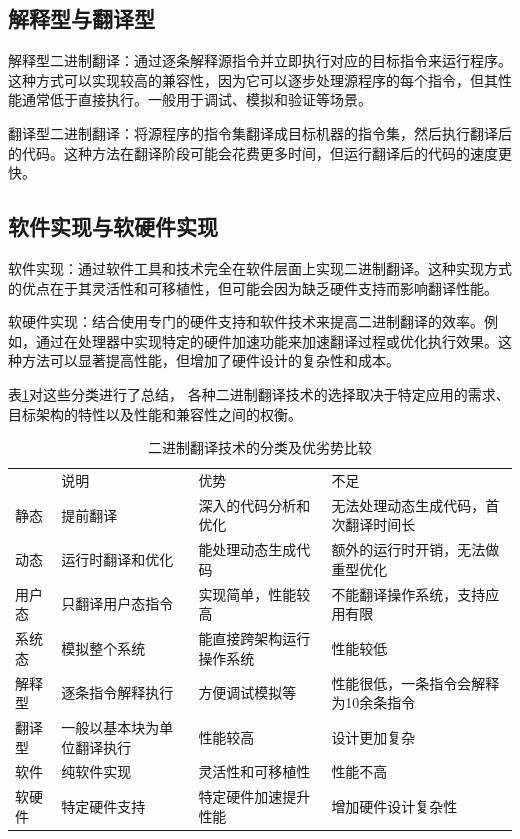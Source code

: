 \subsection{解释型与翻译型}
解释型二进制翻译：通过逐条解释源指令并立即执行对应的目标指令来运行程序。这种方式可以实现较高的兼容性，因为它可以逐步处理源程序的每个指令，但其性能通常低于直接执行。一般用于调试、模拟和验证等场景。

翻译型二进制翻译：将源程序的指令集翻译成目标机器的指令集，然后执行翻译后的代码。这种方法在翻译阶段可能会花费更多时间，但运行翻译后的代码的速度更快。

\subsection{软件实现与软硬件实现}
软件实现：通过软件工具和技术完全在软件层面上实现二进制翻译。这种实现方式的优点在于其灵活性和可移植性，但可能会因为缺乏硬件支持而影响翻译性能。

软硬件实现：结合使用专门的硬件支持和软件技术来提高二进制翻译的效率。例如，通过在处理器中实现特定的硬件加速功能来加速翻译过程或优化执行效果。这种方法可以显著提高性能，但增加了硬件设计的复杂性和成本。

表\ref{tab:BTs}对这些分类进行了总结，
各种二进制翻译技术的选择取决于特定应用的需求、目标架构的特性以及性能和兼容性之间的权衡。

\begin{table}[]
  \caption{二进制翻译技术的分类及优劣势比较}
  \label{tab:BTs}
  \begin{adjustbox}{width=\textwidth}
  \begin{tabular}{llll}
  \rowcolor[HTML]{FFCE93} 
      & 说明                  & 优势           & 不足                  \\
  静态  & 提前翻译                & 深入的代码分析和优化   & 无法处理动态生成代码，首次翻译时间长  \\
  动态  & 运行时翻译和优化            & 能处理动态生成代码    & 额外的运行时开销，无法做重型优化    \\
  \hline
  用户态 & 只翻译用户态指令            & 实现简单，性能较高    & 不能翻译操作系统，支持应用有限     \\
  系统态 &  模拟整个系统 & 能直接跨架构运行操作系统 & 性能较低                \\
  \hline
  解释型 & 逐条指令解释执行            & 方便调试模拟等      & 性能很低，一条指令会解释为10余条指令 \\
  翻译型 & 一般以基本块为单位翻译执行       & 性能较高         & 设计更加复杂              \\
  \hline
  软件  & 纯软件实现               & 灵活性和可移植性     & 性能不高                \\
  软硬件 & 特定硬件支持    & 特定硬件加速提升性能   & 增加硬件设计复杂性          
  \end{tabular}
  \end{adjustbox}
  \end{table}

